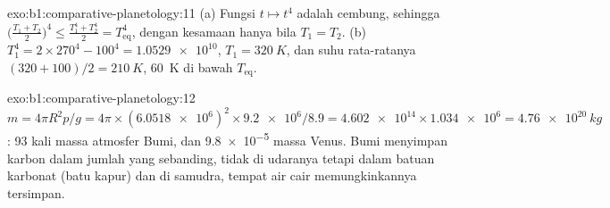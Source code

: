 \begin{solution}{exo:b1:comparative-planetology:11}
(a) Fungsi $t\mapsto t^4$ adalah cembung, sehingga
$\bigl(\tfrac{T_1 + T_2}{2}\bigr)^4 \le \tfrac{T_1^4 + T_2^4}{2} =
T_\mathrm{eq}^4$, dengan kesamaan hanya bila $T_1 = T_2$. (b) $T_1^4 =
2\times270^4 - 100^4 = \num{1.0529e10}$, $T_1 = \qty{320}{K}$, dan suhu
rata-ratanya $(320 + 100)/2 = \qty{210}{K}$, \qty{60}{K} di bawah
$T_\mathrm{eq}$.
\end{solution}

\begin{solution}{exo:b1:comparative-planetology:12}
$m = 4\pi R^2p/g = 4\pi\times(\num{6.0518e6})^2\times\num{9.2e6}/8.9 =
\num{4.602e14}\times\num{1.034e6} = \qty{4.76e20}{kg}$: 93 kali massa atmosfer Bumi, dan \num{9.8e-5} massa Venus. Bumi menyimpan karbon dalam jumlah yang sebanding, tidak di udaranya tetapi dalam batuan karbonat (batu kapur) dan di samudra, tempat air cair memungkinkannya tersimpan.
\end{solution}

